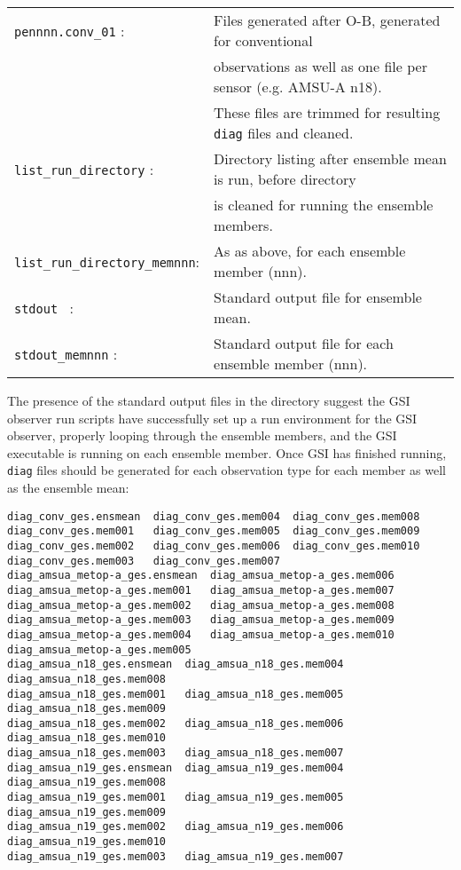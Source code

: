 \begin{table}[htbp]
\centering
\begin{tabular}{ll}
\verb|pennnn.conv_01| : & Files generated after O-B, generated for conventional \\
                                        & observations as well as one file per sensor (e.g. AMSU-A n18). \\
                                         & These files are trimmed for resulting \verb|diag| files and cleaned. \\
\verb|list_run_directory| : &   Directory listing after ensemble mean is run, before directory \\
                                            & is cleaned for running the ensemble members.\\
\verb|list_run_directory_memnnn|:  &    As as above, for each ensemble member (nnn).\\
\verb|stdout | : &  Standard output file for ensemble mean. \\
\verb|stdout_memnnn| : &     Standard output file for each ensemble member (nnn).\\
\end{tabular}
\end{table}
The presence of the standard output files in the directory suggest the GSI observer run scripts have successfully set up a run environment for the GSI observer, properly looping through the ensemble members, and the GSI executable is running on each ensemble member. Once GSI has finished running, \verb|diag| files should be generated for each observation type for each member as well as the ensemble mean:

\begin{footnotesize}
\begin{verbatim}
diag_conv_ges.ensmean  diag_conv_ges.mem004  diag_conv_ges.mem008
diag_conv_ges.mem001   diag_conv_ges.mem005  diag_conv_ges.mem009
diag_conv_ges.mem002   diag_conv_ges.mem006  diag_conv_ges.mem010
diag_conv_ges.mem003   diag_conv_ges.mem007
diag_amsua_metop-a_ges.ensmean  diag_amsua_metop-a_ges.mem006
diag_amsua_metop-a_ges.mem001   diag_amsua_metop-a_ges.mem007
diag_amsua_metop-a_ges.mem002   diag_amsua_metop-a_ges.mem008
diag_amsua_metop-a_ges.mem003   diag_amsua_metop-a_ges.mem009
diag_amsua_metop-a_ges.mem004   diag_amsua_metop-a_ges.mem010
diag_amsua_metop-a_ges.mem005
diag_amsua_n18_ges.ensmean  diag_amsua_n18_ges.mem004  diag_amsua_n18_ges.mem008
diag_amsua_n18_ges.mem001   diag_amsua_n18_ges.mem005  diag_amsua_n18_ges.mem009
diag_amsua_n18_ges.mem002   diag_amsua_n18_ges.mem006  diag_amsua_n18_ges.mem010
diag_amsua_n18_ges.mem003   diag_amsua_n18_ges.mem007
diag_amsua_n19_ges.ensmean  diag_amsua_n19_ges.mem004  diag_amsua_n19_ges.mem008
diag_amsua_n19_ges.mem001   diag_amsua_n19_ges.mem005  diag_amsua_n19_ges.mem009
diag_amsua_n19_ges.mem002   diag_amsua_n19_ges.mem006  diag_amsua_n19_ges.mem010
diag_amsua_n19_ges.mem003   diag_amsua_n19_ges.mem007
\end{verbatim}
\end{footnotesize}

